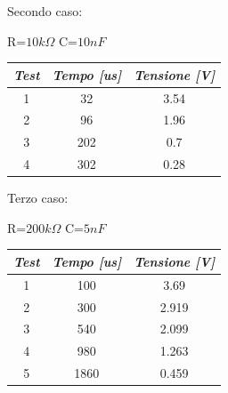     \begin{center}
        Secondo caso: \par
        R=$10k\Omega$ C=$10nF$
    \end{center}
    \begin{center}
    \begin{tabular}{|c|c|c|}
        \hline
        \textit{Test} & \textit{Tempo [us]} & \textit{Tensione [V]} \\
        \hline
        1 & 32 & 3.54 \\
        \hline
        2 & 96 & 1.96 \\
        \hline
        3 & 202 & 0.7 \\
        \hline
        4 & 302 & 0.28 \\
        \hline
    
    \end{tabular}
    \end{center}

    \begin{center}
        Terzo caso: \par
        R=$200k\Omega$ C=$5nF$
    \end{center}
    \begin{center}
    \begin{tabular}{|c|c|c|}
        \hline
        \textit{Test} & \textit{Tempo [us]} & \textit{Tensione [V]} \\
        \hline
        1 & 100 & 3.69 \\
        \hline
        2 & 300 & 2.919 \\
        \hline
        3 & 540 & 2.099 \\
        \hline
        4 & 980 & 1.263 \\
        \hline
        5 & 1860 & 0.459 \\
        \hline
    
    \end{tabular}
    \end{center}

